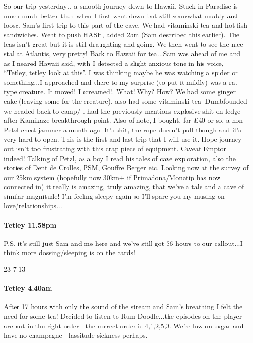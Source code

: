 So our trip yesterday... a smooth journey down to Hawaii. Stuck in Paradise is much much better than when I first went down but still somewhat muddy and loose. Sam’s first trip to this part of the cave. We had vitaminski tea and hot fish sandwiches. Went to push HASH, added 25m (Sam described this earlier). The leas isn’t great but it is still draughting and going. We then went to see the nice stal at Atlantis, very pretty! Back to Hawaii for tea...Sam was ahead of me and as I neared Hawaii said, with I detected a slight anxious tone in his voice, “Tetley, tetley look at this”. I was thinking maybe he was watching a spider or something...I approached and there to my surprise (to put it mildly) was a rat type creature. It moved! I screamed!. What! Why? How? We had some ginger cake (leaving some for the creature), also had some vitaminski tea. Dumbfounded we headed back to camp/ I had the previously mentions explosive shit on ledge after Kamikaze breakthrough point. Also of note, I bought, for £40 or so, a non-Petzl chest jammer a month ago. It’s shit, the rope doesn't pull though and it’s very hard to open. This is the first and last trip that I will use it. Hope journey out isn’t too frustrating with this crap piece of equipment. Caveat Emptor indeed! Talking of Petzl, as a boy I read his tales of cave exploration, also the stories of Dent de Crolles, PSM, Gouffre Berger etc. Looking now at the survey of our 25km system (hopefully now 30km+ if Primadona/Monatip has now connected in) it really is amazing, truly amazing, that we’ve a tale and a cave of similar magnitude!
I’m feeling sleepy again so I’ll spare you my musing on love/relationships...


\paragraph{Tetley 11.58pm}
P.S. it’s still just Sam and me here and we’ve still got 36 hours to our callout...I think more dossing/sleeping is on the cards!


23-7-13


\paragraph{Tetley 4.40am}
After 17 hours with only the sound of the stream and Sam’s breathing I felt the need for some tea! Decided to listen to Rum Doodle...the episodes on the player are not in the right order - the correct order is 4,1,2,5,3. We’re low on sugar and have no champagne - lassitude sickness perhaps.


